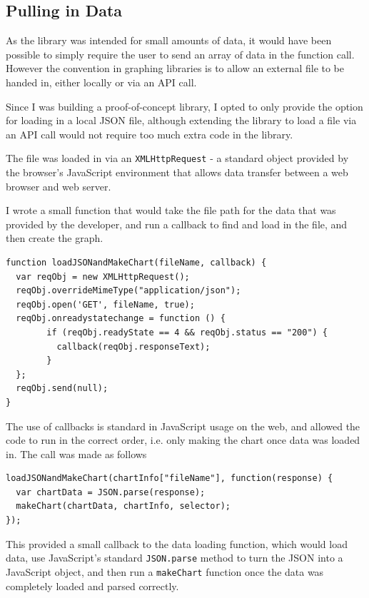 \documentclass[ %
                    author={Aleena Baig},
                supervisor={Dr Simon Lock},
                    degree={BSc},
                     title={On Making Web Accessible Graphs},
                  subtitle={},
                      year={2019} ]{dissertation}
\begin{document}
\subsection{Pulling in Data}

As the library was intended for small amounts of data, it would have been possible to simply require the user to send an array of data in the function call. However the convention in graphing libraries is to allow an external file to be handed in, either locally or via an API call.

Since I was building a proof-of-concept library, I opted to only provide the option for loading in a local JSON file, although extending the library to load a file via an API call would not require too much extra code in the library.

The file was loaded in via an \texttt{XMLHttpRequest} - a standard object provided by the browser's JavaScript environment that allows data transfer between a web browser and web server.


I wrote a small function that would take the file path for the data that was provided by the developer, and run a callback to find and load in the file, and then create the graph.

\begin{lstlisting}
function loadJSONandMakeChart(fileName, callback) {
  var reqObj = new XMLHttpRequest();
  reqObj.overrideMimeType("application/json");
  reqObj.open('GET', fileName, true);
  reqObj.onreadystatechange = function () {
        if (reqObj.readyState == 4 && reqObj.status == "200") {
          callback(reqObj.responseText);
        }
  };
  reqObj.send(null);
}
\end{lstlisting}

The use of callbacks is standard in JavaScript usage on the web, and allowed the code to run in the correct order, i.e. only making the chart once data was loaded in. The call was made as follows

\begin{lstlisting}
loadJSONandMakeChart(chartInfo["fileName"], function(response) {
  var chartData = JSON.parse(response);
  makeChart(chartData, chartInfo, selector);
});
\end{lstlisting}

This provided a small callback to the data loading function, which would load data, use JavaScript's standard \texttt{JSON.parse} method to turn the JSON into a JavaScript object, and then run a \texttt{makeChart} function once the data was completely loaded and parsed correctly.
\end{document}
